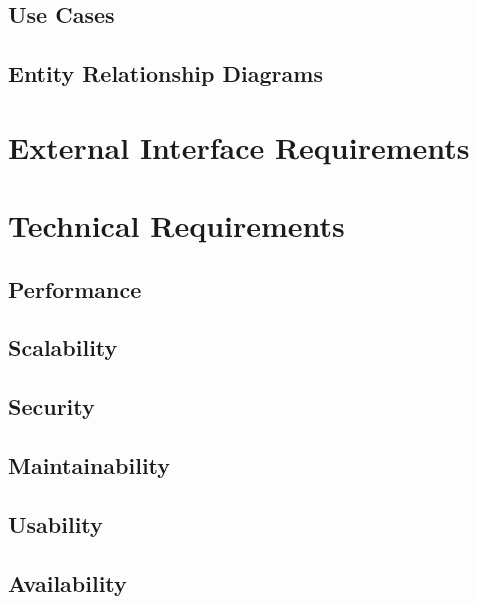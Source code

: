\documentclass{article}
\begin{document}
\subsection{Use Cases}

\subsection{Entity Relationship Diagrams}

\section{External Interface Requirements}
\section{Technical Requirements}
\subsection{Performance}
\subsection{Scalability}
\subsection{Security}
\subsection{Maintainability}
\subsection{Usability}
\subsection{Availability}
\end{document}
